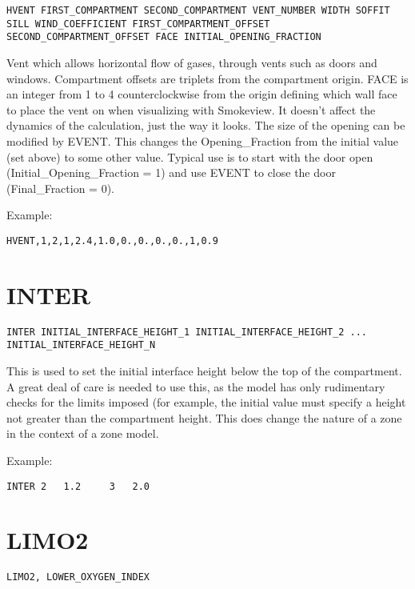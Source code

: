 \begin{lstlisting}
HVENT FIRST_COMPARTMENT SECOND_COMPARTMENT VENT_NUMBER WIDTH SOFFIT SILL WIND_COEFFICIENT FIRST_COMPARTMENT_OFFSET SECOND_COMPARTMENT_OFFSET FACE INITIAL_OPENING_FRACTION
\end{lstlisting}

Vent which allows horizontal flow of gases, through vents such as doors and windows. Compartment offsets are triplets from the compartment origin.  FACE is an integer from 1 to 4 counterclockwise from the origin defining which wall face to place the vent on when visualizing with Smokeview. It doesn't affect the dynamics of the calculation, just the way it looks. The size of the opening can be modified by EVENT. This changes the Opening\_Fraction from the initial value (set above) to some other value. Typical use is to start with the door open (Initial\_Opening\_Fraction = 1) and use EVENT to close the door (Final\_Fraction = 0).

Example:

\begin{lstlisting}
HVENT,1,2,1,2.4,1.0,0.,0.,0.,0.,1,0.9
\end{lstlisting}

\section{INTER}

\begin{lstlisting}
INTER INITIAL_INTERFACE_HEIGHT_1 INITIAL_INTERFACE_HEIGHT_2 ... INITIAL_INTERFACE_HEIGHT_N
\end{lstlisting}

This is used to set the initial interface height below the top of the compartment. A great deal of care is needed to use this, as the model has only rudimentary checks for the limits imposed (for example, the initial value must specify a height not greater than the compartment height. This does change the nature of a zone in the context of a zone model.

Example: 

\begin{lstlisting}
INTER 2   1.2     3   2.0
\end{lstlisting}

\section{LIMO2}

\begin{lstlisting}
LIMO2, LOWER_OXYGEN_INDEX
\end{lstlisting}

